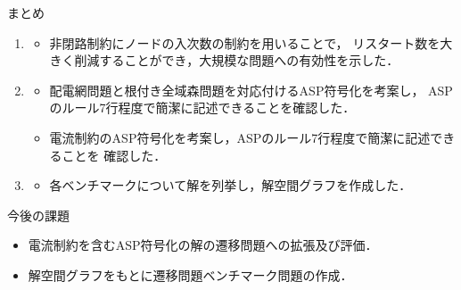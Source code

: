 \documentclass[dvipdfmx,11pt]{beamer}
\begin{document}
\begin{frame}{まとめ}
 \begin{enumerate}
  \item {}
        \begin{itemize}
         \item 非閉路制約にノードの入次数の制約を用いることで，
               リスタート数を大きく削減することができ，大規模な問題への有効性を示した．
        \end{itemize}
  \item {}
        \begin{itemize}
         \item 配電網問題と根付き全域森問題を対応付けるASP符号化を考案し，
               ASPのルール7行程度で簡潔に記述できることを確認した．
         \item 電流制約のASP符号化を考案し，ASPのルール7行程度で簡潔に記述できることを
              確認した．
        \end{itemize}
  \item  {}
         \begin{itemize}
          \item 各ベンチマークについて解を列挙し，解空間グラフを作成した．
         \end{itemize}
 \end{enumerate}\vfill
 \begin{alertblock}{今後の課題}
  \begin{itemize}
   \item 電流制約を含むASP符号化の解の遷移問題への拡張及び評価．
   \item 解空間グラフをもとに遷移問題ベンチマーク問題の作成．
  \end{itemize}
 \end{alertblock} \vfill
\end{frame}



\end{document}

